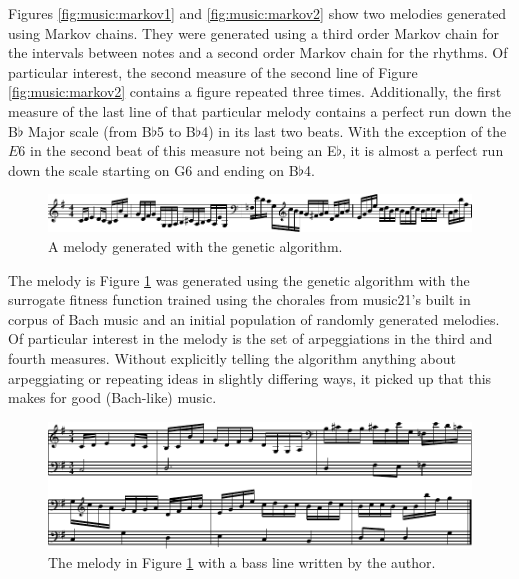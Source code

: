Figures \ref{fig:music:markov1} and \ref{fig:music:markov2} show two melodies generated using Markov chains.
They were generated using a third order Markov chain for the intervals between notes and a second order Markov chain for the rhythms.
Of particular interest, the second measure of the second line of Figure \ref{fig:music:markov2} contains a figure repeated three times.
Additionally, the first measure of the last line of that particular melody contains a perfect run down the B$\flat$ Major scale (from B$\flat$5 to B$\flat$4) in its last two beats.
With the exception of the $E6$ in the second beat of this measure not being an E$\flat$, it is almost a perfect run down the scale starting on G6 and ending on B$\flat$4.


\begin{figure}[h]
	\centering
	\includegraphics[width=\linewidth]{figures/genetic_melody_1.pdf}
	\caption{A melody generated with the genetic algorithm.}
	\label{fig:music:genetic}
\end{figure}

The melody is Figure \ref{fig:music:genetic} was generated using the genetic algorithm with the surrogate fitness function trained using the chorales from music21's built in corpus of Bach music and an initial population of randomly generated melodies.
Of particular interest in the melody is the set of arpeggiations in the third and fourth measures.
Without explicitly telling the algorithm anything about arpeggiating or repeating ideas in slightly differing ways, it picked up that this makes for good (Bach-like) music.

\begin{figure}[h]
	\centering
	\includegraphics[width=\linewidth]{figures/genetic_melody_1_harmonized.pdf}
	\caption{The melody in Figure \ref{fig:music:genetic} with a bass line written by the author.}
	\label{fig:music:geneticHarmonized}
\end{figure}

